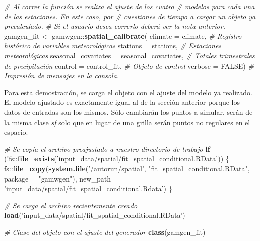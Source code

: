 \documentclass[
  12pt]{article}
\newenvironment{Shaded}{}{}
\newcommand{\CommentTok}[1]{\textcolor[rgb]{0.38,0.63,0.69}{\textit{#1}}}
\newcommand{\ControlFlowTok}[1]{\textcolor[rgb]{0.00,0.44,0.13}{\textbf{#1}}}
\newcommand{\DataTypeTok}[1]{\textcolor[rgb]{0.56,0.13,0.00}{#1}}
\newcommand{\KeywordTok}[1]{\textcolor[rgb]{0.00,0.44,0.13}{\textbf{#1}}}
\newcommand{\NormalTok}[1]{#1}
\newcommand{\OperatorTok}[1]{\textcolor[rgb]{0.40,0.40,0.40}{#1}}
\newcommand{\OtherTok}[1]{\textcolor[rgb]{0.00,0.44,0.13}{#1}}
\newcommand{\StringTok}[1]{\textcolor[rgb]{0.25,0.44,0.63}{#1}}
\begin{document}
\begin{Shaded}
\begin{Highlighting}[]
\CommentTok{# Al correr la función se realiza el ajuste de los cuatro }
\CommentTok{# modelos para cada una de las estaciones. En este caso, por }
\CommentTok{# cuestiones de tiempo a cargar un objeto ya precalculado. }
\CommentTok{# Si el usuario desea correrlo deberá ver la nota anterior.}
\NormalTok{gamgen_fit <-}\StringTok{ }\NormalTok{gamwgen}\OperatorTok{::}\KeywordTok{spatial_calibrate}\NormalTok{(}
  \DataTypeTok{climate =}\NormalTok{ climate, }
  \CommentTok{# Registro histórico de variables meteorológicas}
  \DataTypeTok{stations =}\NormalTok{ stations, }
  \CommentTok{# Estaciones meteorológicas }
  \DataTypeTok{seasonal_covariates =}\NormalTok{ seasonal_covariates, }
  \CommentTok{# Totales trimestrales de precipitación}
  \DataTypeTok{control =}\NormalTok{ control_fit, }
  \CommentTok{# Objeto de control}
  \DataTypeTok{verbose =} \OtherTok{FALSE}\NormalTok{) }
\CommentTok{# Impresión de mensajes en la consola.}
\end{Highlighting}
\end{Shaded}

Para esta demostración, se carga el objeto con el ajuste del modelo ya realizado. El modelo ajustado es exactamente igual al de la sección anterior porque los datos de entradas son los mismos. Sólo cambiarán los puntos a simular, serán de la misma clase \emph{sf} solo que en lugar de una grilla serán puntos no regulares en el espacio.

\begin{Shaded}
\begin{Highlighting}[]
\CommentTok{# Se copia el archivo preajustado a nuestro directorio de trabajo}
\ControlFlowTok{if}\NormalTok{ (}\OperatorTok{!}\NormalTok{fs}\OperatorTok{::}\KeywordTok{file_exists}\NormalTok{(}\StringTok{'input_data/spatial/fit_spatial_conditional.RData'}\NormalTok{)) \{}
\NormalTok{  fs}\OperatorTok{::}\KeywordTok{file_copy}\NormalTok{(}\KeywordTok{system.file}\NormalTok{(}\StringTok{'/autorun/spatial'}\NormalTok{,}
                            \StringTok{"fit_spatial_conditional.RData"}\NormalTok{,}
                            \DataTypeTok{package =} \StringTok{"gamwgen"}\NormalTok{),}
                \DataTypeTok{new_path =} \StringTok{'input_data/spatial/fit_spatial_conditional.Rdata'}\NormalTok{)}
\NormalTok{\}}

\CommentTok{# Se carga el archivo recientemente creado}
\KeywordTok{load}\NormalTok{(}\StringTok{'input_data/spatial/fit_spatial_conditional.RData'}\NormalTok{)}

\CommentTok{# Clase del objeto con el ajuste del generador}
\KeywordTok{class}\NormalTok{(gamgen_fit)}
\end{Highlighting}
\end{Shaded}
\end{document}
